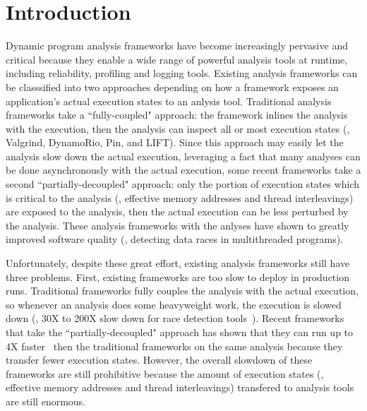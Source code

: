 \section{Introduction} \label{sec:intro}



Dynamic program analysis frameworks have become increasingly pervasive and 
critical because they enable a wide range of powerful analysis tools at 
runtime, including reliability, profiling and logging tools. Existing analysis 
frameworks can be classsified into two approaches depending on how a framework 
exposes an application's actual execution states to an anlysis tool. 
Traditional analysis frameworks take a ``fully-coupled" approach: the framework 
inlines the analysis with the execution, then the analysis can inspect all or 
most execution states (\eg, Valgrind, DynamoRio, Pin, and LIFT). Since this 
approach may easily let the analysis slow down the actual execution, leveraging 
a fact that many analyses can be done asynchronously with the actual execution, 
some recent frameworks take a second ``partially-decoupled" approach: 
only the portion of execution states which is critical to the analysis (\eg, 
effective memory addresses and thread interleavings) are exposed to the 
analysis, then the actual execution can be less perturbed by the analysis. 
These analysis frameworks with the anlyses have shown to greatly improved 
software quality (\eg, detecting data races in multithreaded programs).



Unfortunately, despite these great effort, existing analysis frameworks still 
have three problems. First, existing frameworks are too slow to deploy in 
production runs. Traditional frameworks fully couples the analysis with the 
actual execution, so whenever an analysis does some heavyweight work, the 
execution is slowed down (\eg, 30X to 200X slow down for race detection 
tools~\cite{tsan}). Recent frameworks that take the ``partially-decoupled" 
approach has shown that they can run up to 4X faster~\cite{shadowreplica, 
pararace} then the traditional frameworks on the same analysis because they 
transfer fewer execution states. However, the overall slowdown of these 
frameworks are still prohibitive because the amount of execution states (\eg, 
effective memory addresses and thread interleavings) transfered to analysis 
tools are still enormous.



